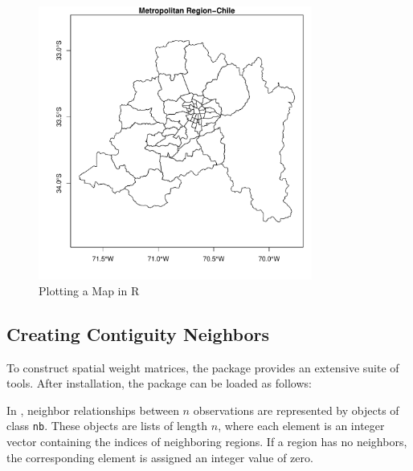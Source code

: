 \begin{figure}[h]
  \caption{Plotting a Map in R}
    \label{fig:plot_mr}
\begin{knitrout}
\color{fgcolor}

{\centering \includegraphics[width=9cm,height=9cm]{figure/plot_mr-1} 

}


\end{knitrout}
\end{figure}

\subsection{Creating Contiguity Neighbors}\label{sec:computing-W-in-R}

To construct spatial weight matrices, the  package \citep{bivand2013computing} provides an extensive suite of tools. After installation, the package can be loaded as follows:

\begin{knitrout}
\color{fgcolor}\begin{kframe}
\begin{alltt}
\hldef{(}\hldef{)}
\end{alltt}
\end{kframe}
\end{knitrout}

In , neighbor relationships between $n$ observations are represented by objects of class \texttt{nb}. These objects are lists of length $n$, where each element is an integer vector containing the indices of neighboring regions. If a region has no neighbors, the corresponding element is assigned an integer value of zero.

